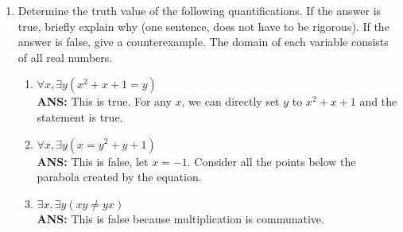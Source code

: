 \documentclass{article}
\begin{document}
\begin{enumerate}
\begin{enumerate}
        \item Let the domain be all real numbers. \\ 
            Let $P(x, y) = $ $x > y$ \\ 
            "For every $x, y$ where $x > y$, there is some $z$ such that $x > z > y$." \\
        \textbf{ANS:} \\
            Predicate: $\forall x(\forall y(\exists z(P(x, y) \rightarrow (P(x, z) \land P(z, y)))$ \\
            Negation (quantifiers): $\exists x(\exists y(\forall z(P(x, y) \land (\neg P(x, z)) \lor \neg P(z, y)))$ \\
            Negation (English): There exists $x, y$ such that $x > y$ and for all $z$, $x \leq z$ or $z \leq y$. \\

            
            
    \end{enumerate}
    \item Determine the truth value of the following quantifications. If the answer is true, briefly explain why (one sentence, does not have to be rigorous). If the answer is false, give a counterexample. The domain of each variable consists of all real numbers.
    \begin{enumerate}
        \item $\forall x, \exists y (x^2 + x + 1 = y)$ \\
        \textbf{ANS: } This is true. For any $x$, we can directly set $y$ to $x^2 + x + 1$ and the statement is true.
        \item $\forall x, \exists y (x = y^2 + y + 1)$ \\
        \textbf{ANS:} This is false, let $x = -1$. Consider all the points below the parabola created by the equation.
        \item $\exists x, \exists y (xy \neq yx)$ \\
        \textbf{ANS:} This is false because multiplication is communative.
    \end{enumerate}
\end{enumerate}
\end{document}

